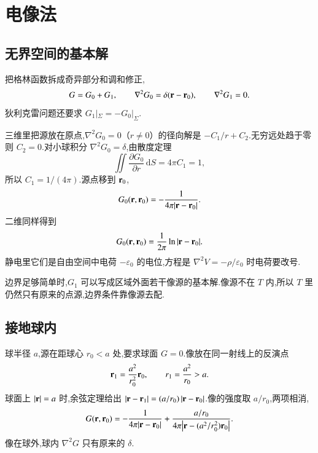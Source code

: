\section{电像法}

\subsection{无界空间的基本解}
把格林函数拆成奇异部分和调和修正,
\begin{equation}
  G=G_0+G_1,
  \qquad
  \nabla^2 G_0=\delta({\mathbf{r}}-{\mathbf{r}}_0),
  \qquad
  \nabla^2 G_1=0.
\end{equation}
狄利克雷问题还要求 $G_1|_{\Sigma}=-G_0|_{\Sigma}$.

三维里把源放在原点,$\nabla^2 G_0=0$（$r\neq 0$）的径向解是 $-C_1/r+C_2$.无穷远处趋于零则 $C_2=0$.对小球积分 $\nabla^2 G_0=\delta$,由散度定理
\begin{equation}
  \iint \frac{\partial G_0}{\partial r}\,\mathrm{d}S
  =4\pi C_1=1,
\end{equation}
所以 $C_1=1/(4\pi)$.源点移到 ${\mathbf{r}}_0$,
\begin{equation}
  G_0({\mathbf{r}},{\mathbf{r}}_0)=-\frac{1}{4\pi|{\mathbf{r}}-{\mathbf{r}}_0|}.
  \label{eq:gf-free-3d}
\end{equation}
二维同样得到
\begin{equation}
  G_0({\mathbf{r}},{\mathbf{r}}_0)=\frac{1}{2\pi}\ln|{\mathbf{r}}-{\mathbf{r}}_0|.
  \label{eq:gf-free-2d}
\end{equation}
静电里它们是自由空间中电荷 $-\varepsilon_0$ 的电位,方程是 $\nabla^2 V=-\rho/\varepsilon_0$ 时电荷要改号.

边界足够简单时,$G_1$ 可以写成区域外面若干像源的基本解.像源不在 $T$ 内,所以 $T$ 里仍然只有原来的点源,边界条件靠像源去配.

\subsection{接地球内}
球半径 $a$,源在距球心 $r_0<a$ 处,要求球面 $G=0$.像放在同一射线上的反演点
\begin{equation}
  {\mathbf{r}}_1=\frac{a^2}{r_0^2}{\mathbf{r}}_0,
  \qquad
  r_1=\frac{a^2}{r_0}>a.
\end{equation}
球面上 $|{\mathbf{r}}|=a$ 时,余弦定理给出 $|{\mathbf{r}}-{\mathbf{r}}_1|=(a/r_0)\,|{\mathbf{r}}-{\mathbf{r}}_0|$.像的强度取 $a/r_0$,两项相消,
\begin{equation}
  G({\mathbf{r}},{\mathbf{r}}_0)
  =-\frac{1}{4\pi|{\mathbf{r}}-{\mathbf{r}}_0|}
   +\frac{a/r_0}{4\pi\bigl|{\mathbf{r}}-(a^2/r_0^2){\mathbf{r}}_0\bigr|}.
  \label{eq:gf-sphere}
\end{equation}
像在球外,球内 $\nabla^2 G$ 只有原来的 $\delta$.

